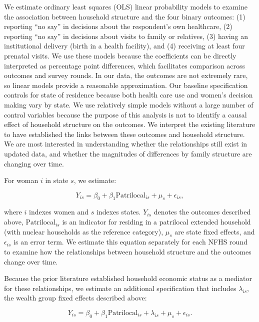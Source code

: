 \documentclass[12pt]{article}
\begin{document}
We estimate ordinary least squares (OLS) linear probability models to examine the association between household structure and the four binary outcomes: (1) reporting ``no say'' in decisions about the respondent's own healthcare, (2) reporting ``no say'' in decisions about visits to family or relatives, (3) having an institutional delivery (birth in a health facility), and (4) receiving at least four prenatal visits. We use these models because the coefficients can be directly interpreted as percentage point differences, which facilitates comparison across outcomes and survey rounds. In our data, the outcomes are not extremely rare, so linear models provide a reasonable approximation.  Our baseline specification controls for state of residence because both health care use and women's decision making vary by state.
We use relatively simple models without a large number of control variables because the purpose of this analysis is not to identify a causal effect of household structure on the outcomes.  We interpret the existing literature to have established the links between these outcomes and household structure.  We are most interested in understanding whether the relationships still exist in updated data, and whether the magnitudes of differences by family structure are changing over time.

For woman $i$ in state $s$, we estimate:

\begin{equation} \label{eq:nocontrols}
Y_{is} = \beta_0 + \beta_1 \text{Patrilocal}_{is} + \mu_s + \epsilon_{is},
\end{equation}

where $i$ indexes women and $s$ indexes states. $Y_{is}$ denotes the outcomes described above, $\text{Patrilocal}_{is}$ is an indicator for residing in a patrilocal extended household (with nuclear households as the reference category), $\mu_s$ are state fixed effects, and $\epsilon_{is}$ is an error term. We estimate this equation separately for each NFHS round to examine how the relationships between household structure and the outcomes change over time.

Because the prior literature established household economic status as a mediator for these relationships, we estimate an additional specification that includes $\lambda_{is}$, the wealth group fixed effects described above:

\begin{equation} \label{eq:controls}
Y_{is} = \beta_0 + \beta_1 \text{Patrilocal}_{is} + \lambda_{is} + \mu_s + \epsilon_{is}.
\end{equation}
\end{document}
